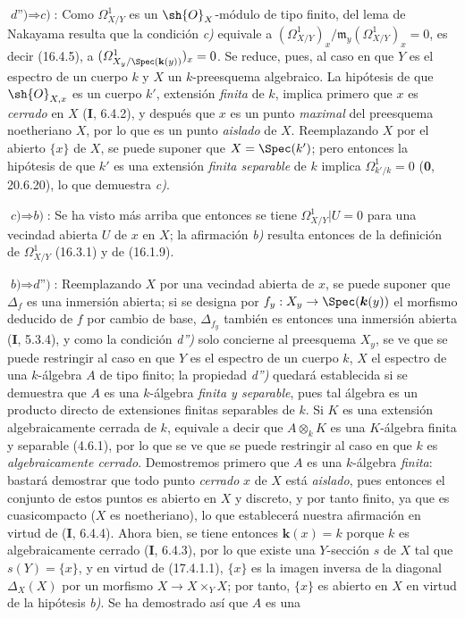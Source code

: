 $\textit{d'')}\Rightarrow\textit{c)}$: Como $\varOmega^1_{X/Y}$ es un $\sh{O}_X$-módulo de tipo finito, del lema de Nakayama resulta que la condición \emph{c)} equivale a $(\varOmega^1_{X/Y})_x/\mathfrak{m}_y(\varOmega^1_{X/Y})_x=0$, es decir (16.4.5), a $(\varOmega^1_{X_y/\Spec(\mathbf{k}(y))})_x=0$. Se reduce, pues, al caso en que $Y$ es el espectro de un cuerpo $k$ y $X$ un $k$-preesquema algebraico. La hipótesis de que $\sh{O}_{X,x}$ es un cuerpo $k'$, extensión \emph{finita} de $k$, implica primero que $x$ es \emph{cerrado} en $X$ (\textbf I, 6.4.2), y después que $x$ es un punto \emph{maximal} del preesquema noetheriano $X$, por lo que es un punto \emph{aislado} de $X$. Reemplazando $X$ por el abierto $\{x\}$ de $X$, se puede suponer que $X=\Spec(k')$; pero entonces la hipótesis de que $k'$ es una extensión \emph{finita separable} de $k$ implica $\Omega^1_{k'/k}=0$ (\textbf 0, 20.6.20), lo que demuestra \emph{c)}.

$\textit{c)}\Rightarrow\textit{b)}$: Se ha visto más arriba que entonces se tiene $\varOmega^1_{X/Y}|U=0$ para una vecindad abierta $U$ de $x$ en $X$; la afirmación \emph{b)} resulta entonces de la definición de $\varOmega^1_{X/Y}$ (16.3.1) y de (16.1.9).

$\textit{b)}\Rightarrow\textit{d'')}$: Reemplazando $X$ por una vecindad abierta de $x$, se puede suponer que $\Delta_f$ es una inmersión abierta; si se designa por $f_y:X_y\to\Spec(\boldsymbol{k}(y))$ el morfismo deducido de $f$ por cambio de base, $\Delta_{f_y}$ también es entonces una inmersión abierta (\textbf I, 5.3.4), y como la condición \emph{d'')} solo concierne al preesquema $X_y$, se ve que se puede restringir al caso en que $Y$ es el espectro de un cuerpo $k$, $X$ el espectro de una $k$-álgebra $A$ de tipo finito; la propiedad \emph{d'')} quedará establecida si se demuestra que $A$ es una $k$-álgebra \emph{finita y separable}, pues tal álgebra es un producto directo de extensiones finitas separables de $k$. Si $K$ es una extensión algebraicamente cerrada de $k$, equivale a decir que $A\otimes_k K$ es una $K$-álgebra finita y separable (4.6.1), por lo que se ve que se puede restringir al caso en que $k$ es \emph{algebraicamente cerrado}. Demostremos primero que $A$ es una $k$-álgebra \emph{finita}: bastará demostrar que todo punto \emph{cerrado} $x$ de $X$ está \emph{aislado}, pues entonces el conjunto de estos puntos es abierto en $X$ y discreto, y por tanto finito, ya que es cuasicompacto ($X$ es noetheriano), lo que establecerá nuestra afirmación en virtud de (\textbf I, 6.4.4). Ahora bien, se tiene entonces $\boldsymbol{k}(x)=k$ porque $k$ es algebraicamente cerrado (\textbf I, 6.4.3), por lo que existe una $Y$-sección $s$ de $X$ tal que $s(Y)=\{x\}$, y en virtud de (17.4.1.1), $\{x\}$ es la imagen inversa de la diagonal $\Delta_X(X)$ por un morfismo $X\to X\times_Y X$; por tanto, $\{x\}$ es abierto en $X$ en virtud de la hipótesis \emph{b)}. Se ha demostrado así que $A$ es una

